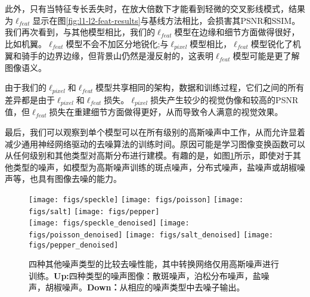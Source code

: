 此外，只有当特征专长丢失时，在放大倍数下才能看到轻微的交叉影线模式，结果为$ \ell_{feat} $显示在图\ref{fig:l1-l2-feat-results}与基线方法相比，会损害其PSNR和SSIM。我们再次看到，与其他模型相比，我们的$ \ell_{feat} $模型在边缘和细节方面做得很好，比如机翼。$ \ell_{feat} $模型不会不加区分地锐化;与$ \ell_{pixel} $模型相比，$ \ell_{feat} $模型锐化了机翼和骑手的边界边缘，但背景山仍然是漫反射的，这表明$ \ell_{feat} $模型可能是更了解图像语义。

由于我们的$ \ell_{pixel} $和$ \ell_{feat} $模型共享相同的架构，数据和训练过程，它们之间的所有差异都是由于$ \ell_{pixel} $和$ \ell_{feat} $损失。$ \ell_{pixel} $损失产生较少的视觉伪像和较高的PSNR值，但$ \ell_{feat} $损失在重建细节方面做得更好，从而导致令人满意的视觉效果。

最后，我们可以观察到单个模型可以在所有级别的高斯噪声中工作，从而允许显着减少通用神经网络驱动的去噪算法的训练时间。原因可能是学习图像变换函数可以从任何级别和其他类型对高斯分布进行建模。有趣的是，如图\ref{fig:other-type-results}所示，即使对于其他类型的噪声，如模型为高斯噪声训练的斑点噪声，分布式噪声，盐噪声或胡椒噪声等，也具有图像去噪的能力。

\begin{figure}[t]
 \centering
   \texttt{[image: figs/speckle]}
  \texttt{[image: figs/poisson]}
  \texttt{[image: figs/salt]}
  \texttt{[image: figs/pepper]} \\{}
  \texttt{[image: figs/speckle\_denoised]}
  \texttt{[image: figs/poisson\_denoised]}
  \texttt{[image: figs/salt\_denoised]}
  \texttt{[image: figs/pepper\_denoised]} \\
    
   \caption[四种其他噪声类型的比较去噪结果图]{四种其他噪声类型的比较去噪性能，其中转换网络仅用高斯噪声进行训练。\textbf{Up:}四种类型的噪声图像：散斑噪声，泊松分布噪声，盐噪声，胡椒噪声。\textbf{Down：}从相应的噪声类型中去噪子输出。
   }
   \vspace{-4mm}
   \label{fig:other-type-results}
 \end{figure}
 

